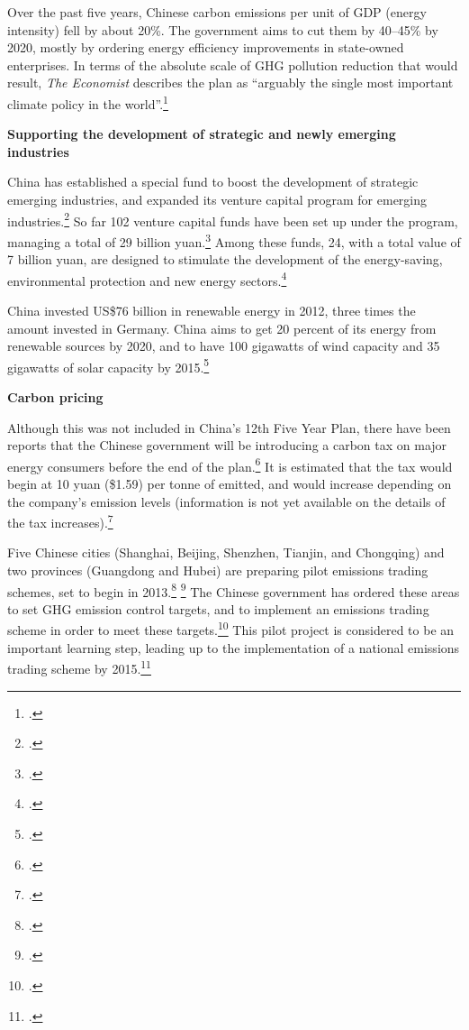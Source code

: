 \documentclass[10pt]{article}
\begin{document}
Over the past five years, Chinese carbon emissions per unit of GDP (energy intensity) fell by about 20\%.
The government aims to cut them by 40--45\% by 2020, mostly by ordering energy efficiency improvements in state-owned enterprises.
In terms of the absolute scale of GHG pollution reduction that would result, \emph{The Economist} describes the plan as ``arguably the single most important climate policy in the world''.\footcite[][p. 21]{EastGrey2013}



\textbf{Supporting the development of strategic and newly emerging industries}



China has established a special fund to boost the development of strategic emerging industries, and expanded its venture capital program for emerging industries.\footcite[][]{EmergingIndustries}
So far 102 venture capital funds have been set up under the program, managing a total of 29 billion yuan.\footcite[][]{EmergingIndustries}
Among these funds, 24, with a total value of 7 billion yuan, are designed to stimulate the development of the energy-saving, environmental protection and new energy sectors.\footcite[][]{EmergingIndustries}



China invested US\$76 billion in renewable energy in 2012, three times the amount invested in Germany.
China aims to get 20 percent of its energy from renewable sources by 2020, and to have 100 gigawatts of wind capacity and 35 gigawatts of solar capacity by 2015.\footcite[][p. 21]{EastGrey2013}



\textbf{Carbon pricing}



Although this was not included in China's 12th Five Year Plan, there have been reports that the Chinese government will be introducing a carbon tax on major energy consumers before the end of the plan.\footcite[][]{ChinaCarbonTax}
It is estimated that the tax would begin at 10 yuan (\$1.59) per tonne of  emitted, and would increase depending on the company’s emission levels (information is not yet available on the details of the tax increases).\footcite[][]{ChinaCarbonTax}



Five Chinese cities (Shanghai, Beijing, Shenzhen, Tianjin, and Chongqing) and two provinces (Guangdong and Hubei) are preparing pilot emissions trading schemes, set to begin in 2013.\footcite[][]{PilotTrading} \footcite[][p. 21]{EastGrey2013}
The Chinese government has ordered these areas to set GHG emission control targets, and to implement an emissions trading scheme in order to meet these targets.\footcite[][]{PilotTrading}
This pilot project is considered to be an important learning step, leading up to the implementation of a national emissions trading scheme by 2015.\footcite[][]{PilotTrading}
\end{document}
